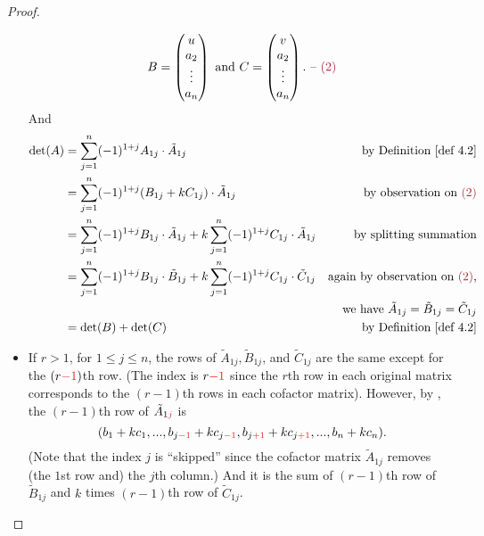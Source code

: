 \begin{proof}
\begin{itemize}
\[    B = \begin{pmatrix} u \\ a_2 \\ \vdots \\ a_n \end{pmatrix}
    \text{ and }
    C = \begin{pmatrix} v \\ a_2 \\ \vdots \\ a_n \end{pmatrix}. \text{ -- \MAROON{(2)}}
\]
And
\begin{align*}
    \det(A) & = \sum_{j = 1}^n (-1)^{1 + j} A_{1j} \cdot \tilde{A}_{1j} & \text{by \DEF{4.2}} \\
            & = \sum_{j = 1}^n (-1)^{1 + j} (B_{1j} + k C_{1j}) \cdot \tilde{A}_{1j} & \text{by observation on \MAROON{(2)}} \\
            & = \sum_{j = 1}^n (-1)^{1 + j} B_{1j} \cdot \tilde{A}_{1j} + k \sum_{j = 1}^n (-1)^{1 + j} C_{1j} \cdot \tilde{A}_{1j} & \text{by splitting summation} \\
            & = \sum_{j = 1}^n (-1)^{1 + j} B_{1j} \cdot \tilde{B}_{1j} + k \sum_{j = 1}^n (-1)^{1 + j} C_{1j} \cdot \tilde{C}_{1j} & \text{again by observation on \MAROON{(2)},} \\
            & & \text{we have \(\tilde{A}_{1j} = \tilde{B}_{1j} = \tilde{C}_{1j}\)} \\
            & = \det(B) + \det(C) & \text{by \DEF{4.2}}
\end{align*}

\item
If \(r > 1\), for \(1 \le j \le n\), the rows of \(\tilde{A}_{1j}, \tilde{B}_{1j}\), and \(\tilde{C}_{1j}\) are the same except for the \((r \RED{ - 1})\)th row.
(The index is \(r \RED{ - 1}\) since the \(r\)th row in each original matrix corresponds to the \((r - 1)\)th rows in each cofactor matrix).
However, by , the \((r - 1)\)th row of \(\tilde{A}_{1\RED{j}}\) is
\[
    (b_1 + k c_1, ..., b_{j \RED{- 1}} + k c_{j \RED{- 1}}, b_{j \RED{+ 1}} + k c_{j \RED{+ 1}}, ..., b_n + k c_n).
\]
(Note that the index \(j\) is ``skipped'' since the cofactor matrix \(\tilde{A}_{1j}\) removes (the \(1\)st row and) the \(j\)th column.)
And it is the sum of \((r - 1)\)th row of \(\tilde{B}_{1j}\) and \(k\) times \((r - 1)\)th row of \(\tilde{C}_{1j}\).


\end{itemize}
\end{proof}
